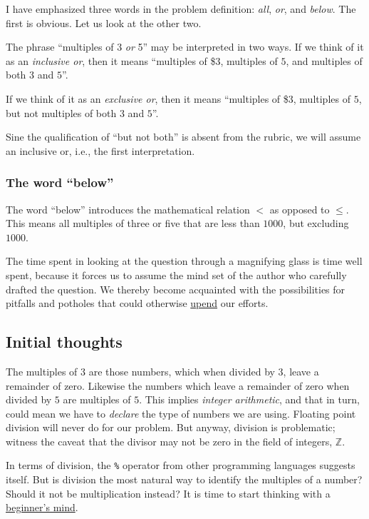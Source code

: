 \documentclass[
  a4paper,
]{article}
\begin{document}
I have emphasized three words in the problem definition: \emph{all},
\emph{or}, and \emph{below}. The first is obvious. Let us look at the
other two.

The phrase ``multiples of 3 \emph{or} 5'' may be interpreted in two
ways. If we think of it as an \emph{inclusive or}, then it means
``multiples of \$3, multiples of \(5\), and multiples of both \(3\) and
\(5\)''.

If we think of it as an \emph{exclusive or}, then it means ``multiples
of \$3, multiples of \(5\), but not multiples of both \(3\) and \(5\)''.

Sine the qualification of ``but not both'' is absent from the rubric, we
will assume an inclusive or, i.e., the first interpretation.

\hypertarget{the-word-below}{%
\subsubsection{The word ``below''}\label{the-word-below}}

The word ``below'' introduces the mathematical relation \(<\) as opposed
to \(\leq\). This means all multiples of three or five that are less
than \(1000\), but excluding \(1000\).

The time spent in looking at the question through a magnifying glass is
time well spent, because it forces us to assume the mind set of the
author who carefully drafted the question. We thereby become acquainted
with the possibilities for pitfalls and potholes that could otherwise
\href{https://www.powerthesaurus.org/upend/synonyms}{upend} our efforts.

\hypertarget{initial-thoughts}{%
\subsection{Initial thoughts}\label{initial-thoughts}}

The multiples of \(3\) are those numbers, which when divided by \(3\),
leave a remainder of zero. Likewise the numbers which leave a remainder
of zero when divided by \(5\) are multiples of \(5\). This implies
\emph{integer arithmetic}, and that in turn, could mean we have to
\emph{declare} the type of numbers we are using. Floating point division
will never do for our problem. But anyway, division is problematic;
witness the caveat that the divisor may not be zero in the field of
integers, \(\mathbb{Z}\).

In terms of division, the \texttt{\%} operator from other programming
languages suggests itself. But is division the most natural way to
identify the multiples of a number? Should it not be multiplication
instead? It is time to start thinking with a
\href{https://en.wikipedia.org/wiki/Shoshin}{beginner's mind}.
\end{document}

